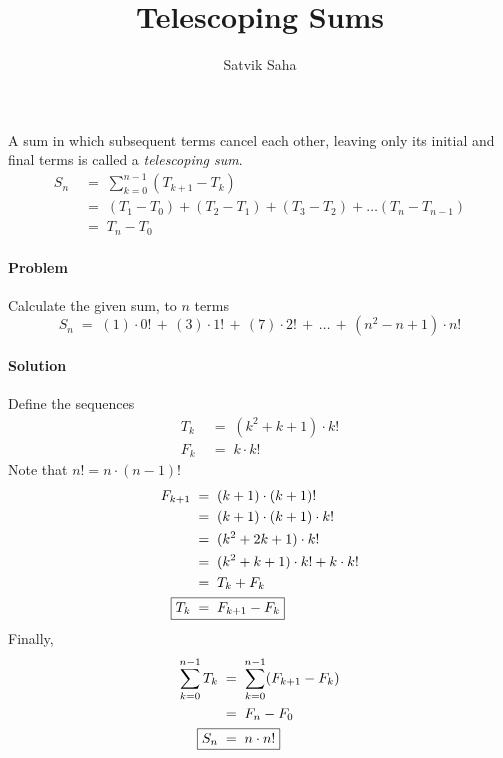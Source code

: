 \documentclass[a4paper, 11pt, reqno]{article}
\title{Telescoping Sums}
\author{Satvik Saha}
\date{}
\newcounter{prob}
\def\problem{\stepcounter{prob}\paragraph{Problem \arabic{prob}}}
\def\solution{\paragraph{Solution}}
\begin{document}
	\maketitle
	
	A sum in which subsequent terms cancel each other, leaving only its initial and final terms is called a
	\textit{telescoping sum}.
	\begin{align*}
		S_n  \; &= \; \sum_{k=0}^{n-1} (T_{k+1} - T_{k})	\\
		     \; &= \; (T_1 - T_0) + (T_2 - T_1) + (T_3 - T_2) + \dots (T_{n} - T_{n-1})	\\
		     \; &= \; T_{n} - T_{0}
	\end{align*}
	
	\problem
	Calculate the given sum, to $n$ terms
	\begin{equation*}
		S_n  \;=\;  (1)\cdot 0! \,+\, (3)\cdot 1! \,+\, (7)\cdot 2! \,+\, \dots \,+\, (n^2 - n + 1)\cdot n!
	\end{equation*}
	\solution
	Define the sequences
	\begin{align*}
		T_k  \; &= \;  (k^2 + k + 1)\cdot k! \\
		F_k  \; &= \;  k\cdot k!
	\end{align*}
	Note that $n! = n\cdot (n-1)!$
	\begin{align*}
		F_{k+1}  \; &= \; (k + 1)\cdot (k + 1)! \\
			 \; &= \; (k + 1)\cdot (k + 1)\cdot k! \\
			 \; &= \; (k^2 + 2k + 1)\cdot k! \\
			 \; &= \; (k^2 + k + 1)\cdot k! + k\cdot k! \\
			 \; &= \; T_k + F_k \\
		\Aboxed{T_k \; &= \;  F_{k+1} - F_{k}}
	\end{align*}
	Finally,
	\begin{align*}
		\sum_{k=0}^{n-1} T_k
		 	\; &= \; \sum_{k=0}^{n-1} (F_{k+1} - F_{k}) \\
			\; &= \; F_n - F_0 \\
		\Aboxed{S_n	\; &= \;  n\cdot n!}
	\end{align*}
\end{document}
